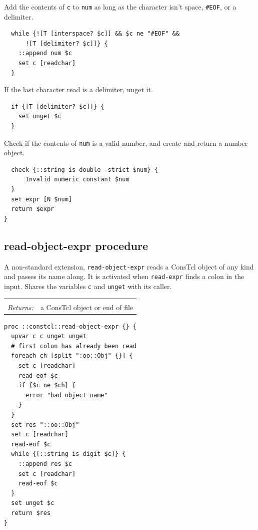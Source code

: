 \documentclass[a5paper,draft]{memoir}
\begin{document}
Add the contents of \texttt{c} to \texttt{num} as long as the character isn't space, \texttt{\#EOF}, or a delimiter.

\begin{lstlisting}
  while {![T [interspace? $c]] && $c ne "#EOF" &&
      ![T [delimiter? $c]]} {
    ::append num $c
    set c [readchar]
  }
\end{lstlisting}

If the last character read is a delimiter, unget it.

\begin{lstlisting}
  if {[T [delimiter? $c]]} {
    set unget $c
  }
\end{lstlisting}

Check if the contents of \texttt{num} is a valid number, and create and return a number object.

\begin{lstlisting}
  check {::string is double -strict $num} {
      Invalid numeric constant $num
  }
  set expr [N $num]
  return $expr
}
\end{lstlisting}

\subsection{read-object-expr procedure}
\label{readobjectexpr-procedure}

A non-standard extension, \texttt{read-object-expr} reads a ConsTcl object of any kind and passes its name along. It is activated when \texttt{read-expr} finds a colon in the input. Shares the variables \texttt{c} and \texttt{unget} with its caller.

\noindent\begin{tabular}{ |p{1.9cm} p{6.5cm}| }
\hline
\rowcolor[HTML]{CCCCCC} \multicolumn{2}{|l|}{\textbf{read-object-expr (internal)}} \\
\textit{Returns:} & a ConsTcl object or end of file \\
\hline
\end{tabular}

\begin{lstlisting}
proc ::constcl::read-object-expr {} {
  upvar c c unget unget
  # first colon has already been read
  foreach ch [split ":oo::Obj" {}] {
    set c [readchar]
    read-eof $c
    if {$c ne $ch} {
      error "bad object name"
    }
  }
  set res "::oo::Obj"
  set c [readchar]
  read-eof $c
  while {[::string is digit $c]} {
    ::append res $c
    set c [readchar]
    read-eof $c
  }
  set unget $c
  return $res
}
\end{lstlisting}
\end{document}
